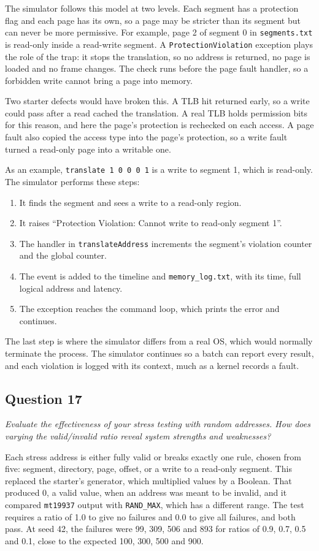 \documentclass[11pt]{article}
\newcommand{\question}[2]{\subsection*{Question #1}\noindent\textit{#2}\par\medskip}
\newcommand{\code}[1]{\texttt{#1}}
\begin{document}
The simulator follows this model at two levels. Each segment has a protection flag
and each page has its own, so a page may be stricter than its segment but can
never be more permissive. For example, page 2 of segment 0 in \code{segments.txt}
is read-only inside a read-write segment. A \code{ProtectionViolation} exception
plays the role of the trap: it stops the translation, so no address is returned,
no page is loaded and no frame changes. The check runs before the page fault
handler, so a forbidden write cannot bring a page into memory.

Two starter defects would have broken this. A TLB hit returned early, so a write
could pass after a read cached the translation. A real TLB holds permission bits
for this reason, and here the page's protection is rechecked on each access. A
page fault also copied the access type into the page's protection, so a write
fault turned a read-only page into a writable one.

As an example, \code{translate 1 0 0 0 1} is a write to segment 1, which is
read-only. The simulator performs these steps:
\begin{enumerate}
  \item It finds the segment and sees a write to a read-only region.
  \item It raises ``Protection Violation: Cannot write to read-only segment 1''.
  \item The handler in \code{translateAddress} increments the segment's violation
        counter and the global counter.
  \item The event is added to the timeline and \code{memory\_log.txt}, with its
        time, full logical address and latency.
  \item The exception reaches the command loop, which prints the error and continues.
\end{enumerate}

The last step is where the simulator differs from a real OS, which would normally
terminate the process. The simulator continues so a batch can report every result,
and each violation is logged with its context, much as a kernel records a
fault.

\question{17}{Evaluate the effectiveness of your stress testing with random addresses. How does varying the valid/invalid ratio reveal system strengths and weaknesses?}
Each stress address is either fully valid or breaks exactly one rule, chosen from
five: segment, directory, page, offset, or a write to a read-only segment. This
replaced the starter's generator, which multiplied values by a Boolean. That
produced 0, a valid value, when an address was meant to be invalid, and it compared
\code{mt19937} output with \code{RAND\_MAX}, which has a different range. The test
requires a ratio of 1.0 to give no failures and 0.0 to give all failures, and both
pass. At seed 42, the failures were 99, 309, 506 and 893 for ratios of 0.9, 0.7, 0.5
and 0.1, close to the expected 100, 300, 500 and 900.
\end{document}
